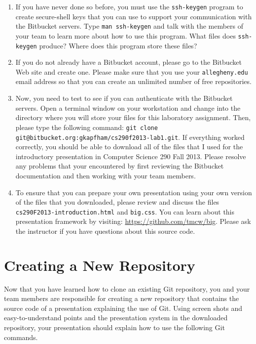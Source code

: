\begin{enumerate}
	\item If you have never done so before, you must use the {\tt ssh-keygen} program to create secure-shell keys that
		you can use to support your communication with the Bitbucket servers.  Type {\tt man ssh-keygen} and talk with
		the members of your team to learn more about how to use this program.  What files does {\tt ssh-keygen} produce? 
		Where does this program store these files?

	\item If you do not already have a Bitbucket account, please go to the Bitbucket Web site and create one.  Please
		make sure that you use your {\tt allegheny.edu} email address so that you can create an unlimited number of free
		repositories.

	\item Now, you need to test to see if you can authenticate with the Bitbucket servers.  Open a terminal window on
		your workstation and change into the directory where you will store your files for this laboratory assignment.
		Then, please type the following command: {\tt git clone git@bitbucket.org:gkapfham/cs290f2013-lab1.git}.  If
		everything worked correctly, you should be able to download all of the files that I used for the introductory
		presentation in Computer Science 290 Fall 2013. Please resolve any problems that your encountered by first
		reviewing the Bitbucket documentation and then working with your team members.

	\item To ensure that you can prepare your own presentation using your own version of the files that you downloaded, please review
		and discuss the files {\tt cs290F2013-introduction.html} and {\tt big.css}. You can learn about this
		presentation framework by visiting: \url{https://github.com/tmcw/big}. Please ask the instructor if you have
		questions about this source code.

\end{enumerate}

\section*{Creating a New Repository}

Now that you have learned how to clone an existing Git repository, you and your team members are responsible for
creating a new repository that contains the source code of a presentation explaining the use of Git. Using screen shots
and easy-to-understand points and the presentation system in the downloaded repository, your presentation should explain
how to use the following Git commands. 

